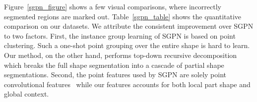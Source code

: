\begin{table}[!t]\centering\small
 \vspace{5pt}
\caption{Comparison with SGPN~\cite{Wang2017SGPN} on fine-grained instance segmentation over the FineSeg dataset. The metric is AP ($\%$) with IoU threshold being $0.25$ and $0.5$, respectively.}
\label{sgpn_table}\vspace{-8pt}
\end{table}

Figure~\ref{sgpn_figure} shows a few visual comparisons, where incorrectly segmented regions are marked out. Table~\ref{sgpn_table} shows the quantitative comparison on our datasets. We attribute the consistent improvement over SGPN to two factors. First, the instance group learning of SGPN is based on point clustering. Such a one-shot point grouping over the entire shape is hard to learn. Our method, on the other hand, performs top-down recursive decomposition which breaks the full shape segmentation into a cascade of partial shape segmentations. Second, the point features used by SGPN are solely point convolutional features~\cite{qi2016pointnet} while our features accounts for both local part shape and global context.
